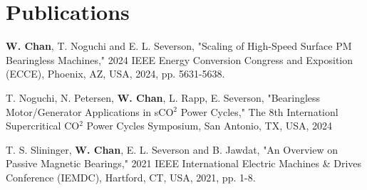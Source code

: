 \section{\sc Publications}

\textbf{W. Chan}, T. Noguchi and E. L. Severson, "Scaling of High-Speed Surface PM Bearingless Machines," 2024 IEEE Energy Conversion Congress and Exposition (ECCE), Phoenix, AZ, USA, 2024, pp. 5631-5638.

T. Noguchi, N. Petersen, \textbf{W. Chan}, L. Rapp, E. Severson,  "Bearingless Motor/Generator Applications in sCO$^2$ Power Cycles," The 8th Internationl Supercritical CO$^2$ Power Cycles Symposium, San Antonio, TX, USA, 2024


T. S. Slininger, \textbf{W. Chan}, E. L. Severson and B. Jawdat, "An Overview on Passive Magnetic Bearings," 2021 IEEE International Electric Machines \& Drives Conference (IEMDC), Hartford, CT, USA, 2021, pp. 1-8.

\endinput